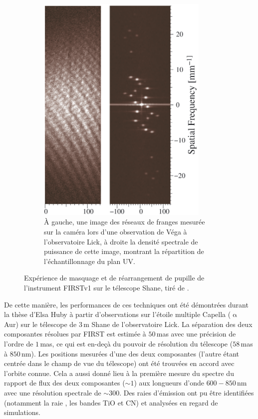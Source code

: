 \begin{figure}[ht!]
\begin{subfigure}[t]{0.45\textwidth}
        \includegraphics[width=0.9\textwidth]{Figure_Chap1/Huby2012_Figure3.png}
        \caption{À gauche, une image des réseaux de franges mesurée sur la caméra lors d'une observation de Véga à l'observatoire Lick, à droite la densité spectrale de puissance de cette image, montrant la répartition de l'échantillonnage du plan UV.}
        \label{fig:FIRSTv1PupilMaskingB}
    \end{subfigure}
    \caption[Expérience de réarrangement de pupille de l'instrument FIRSTv1 sur le télescope Shane.]{Expérience de masquage et de réarrangement de pupille de l'instrument FIRSTv1 sur le télescope Shane, tiré de \cite{huby2012}.}
    \label{fig:FIRSTv1PupilMasking}
\end{figure}

De cette manière, les performances de ces techniques ont été démontrées durant la thèse d'Elsa Huby \citep{huby2013} à partir d'observations sur l'étoile multiple Capella ($\upalpha$ Aur) sur le télescope de $3 \,$m Shane de l'observatoire Lick. La séparation des deux composantes résolues par \ac{FIRST} est estimée à $50 \,$mas avec une précision de l'ordre de $1 \,$mas, ce qui est en-deçà du pouvoir de résolution du télescope ($58 \,$mas à $850 \,$nm). Les positions mesurées d'une des deux composantes (l'autre étant centrée dans le champ de vue du télescope) ont été trouvées en accord avec l'orbite connue. Cela a aussi donné lieu à la première mesure du spectre du rapport de flux des deux composantes ($\sim 1$) aux longueurs d'onde $600 - 850 \,$nm avec une résolution spectrale de $\sim 300$. Des raies d'émission ont pu être identifiées (notamment la raie \ha, les bandes TiO et CN) et analysées en regard de simulations.

